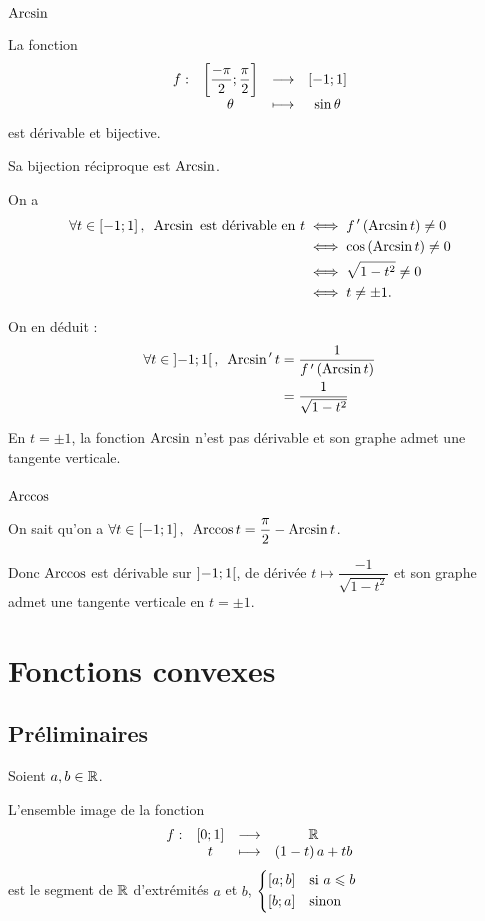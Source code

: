 \subsubsection{\(\operatorname{Arcsin}\)}

La fonction \[\begin{array}[t]{cccc}f : & \left[\dfrac{-\pi}{2};\dfrac{\pi}{2}\right] & \longrightarrow & \left[-1;1\right] \\ & \theta & \longmapsto & \sin\theta\end{array}\] est dérivable et bijective.

Sa bijection réciproque est \(\operatorname{Arcsin}\).

On a \[\begin{aligned}
\quantifs{\forall t\in\intervii{-1}{1}}\Arcsin\text{ est dérivable en }t&\ssi f\prim\paren{\Arcsin t}\not=0 \\
&\ssi\cos\paren{\Arcsin t}\not=0 \\
&\ssi\sqrt{1-t^2}\not=0 \\
&\ssi t\not=\pm1.
\end{aligned}\]

On en déduit : \[\begin{aligned}
\quantifs{\forall t\in\intervee{-1}{1}}\Arcsin\prim t&=\dfrac{1}{f\prim\paren{\Arcsin t}} \\
&=\dfrac{1}{\sqrt{1-t^2}}
\end{aligned}\]

En \(t=\pm1\), la fonction \(\operatorname{Arcsin}\) n'est pas dérivable et son graphe admet une tangente verticale.

\subsubsection{\(\operatorname{Arccos}\)}

On sait qu'on a \(\quantifs{\forall t\in\intervii{-1}{1}}\Arccos t=\dfrac{\pi}{2}-\Arcsin t\).

Donc \(\operatorname{Arccos}\) est dérivable sur \(\left]-1;1\right[\), de dérivée \(t\mapsto\dfrac{-1}{\sqrt{1-t^2}}\) et son graphe admet une tangente verticale en \(t=\pm1\).

\section{Fonctions convexes}

\subsection{Préliminaires}

\begin{rem}
Soient \(a,b\in\mathbb{R}\).

L'ensemble image de la fonction \[\begin{array}[t]{cccc}f : & \left[0;1\right] & \longrightarrow & \mathbb{R} \\ & t & \longmapsto & \left(1-t\right)a+tb\end{array}\] est le segment de \(\mathbb{R}\) d'extrémités \(a\) et \(b\), \cad \(\begin{dcases}\left[a;b\right] &\text{si }a\leqslant b \\ \left[b;a\right] &\text{sinon}\end{dcases}\)
\end{rem}

